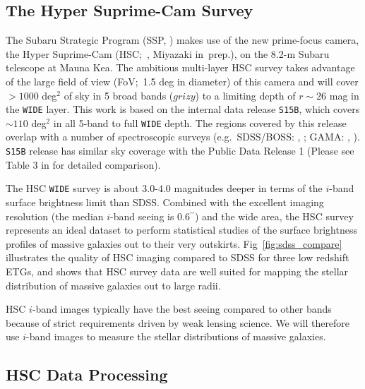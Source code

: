 \documentclass[a4paper,fleqn,usenatbib]{mnras}
\def\asec{$^{\prime\prime}$}
\begin{document}
\subsection{The Hyper Suprime-Cam Survey}
    \label{ssec:hsc}

    The Subaru Strategic Program (SSP, \citealt{HSC_SSP, HSC_DR1}) makes use of the 
    new prime-focus camera, the Hyper Suprime-Cam (HSC;~\citealt{Miyazaki2012}, 
    Miyazaki in~prep.), on the 
    8.2-m Subaru telescope at Mauna Kea. 
    The ambitious multi-layer HSC survey takes advantage of the large field of 
    view (FoV;~1.5 deg in diameter) of this camera and will cover $>1000$ deg$^2$ 
    of sky in 5 broad bands ($grizy$) to a limiting depth of $r {\sim} 26$ mag 
    in the \texttt{WIDE} layer. 
    This work is based on the internal data release \texttt{S15B}, which covers 
    ${\sim} 110$ deg$^2$ in all 5-band to full \texttt{WIDE} depth.  
    The regions covered by this release overlap with a number of spectroscopic surveys 
    (e.g.\ SDSS/BOSS: \citealt{Eisenstein2011}, \citealt{Alam2015}; 
    GAMA: \citealt{Driver2011}, \citealt{Liske2015}).
    \texttt{S15B} release has similar sky coverage with the Public Data Release 1
    (Please see Table 3 in \citealt{HSC_DR1} for detailed comparison).

    The HSC \texttt{WIDE} survey is about $3.0$-$4.0$ magnitudes deeper in terms of 
    the $i$-band surface brightness limit than SDSS. 
    Combined with the excellent imaging resolution (the median $i$-band seeing is 
    0.6\asec) and the wide area, the HSC survey represents an ideal dataset to perform 
    statistical studies of the surface brightness profiles of massive galaxies out to 
    their very outskirts.  
    Fig~\ref{fig:sdss_compare} illustrates the quality of HSC imaging compared to SDSS 
    for three low redshift ETGs, and shows that HSC survey data are well suited for 
    mapping the stellar distribution of massive galaxies out to large radii.

	HSC $i$-band images typically have the best seeing compared to other bands because 
	of strict requirements driven by weak lensing science. 
    We will therefore use $i$-band images to measure the stellar distributions of 
    massive galaxies.
    
\subsection{HSC Data Processing}
    \label{sec:pipeline}
\end{document}
